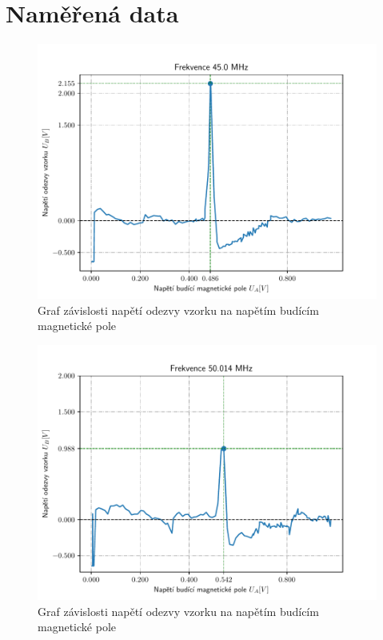 \documentclass{article}
\begin{document}
\section{Naměřená data}
\begin{figure}[!h]
  \hspace*{-10em}
  \includegraphics[scale=1.2]{figs/1.pdf}
  \caption{Graf závislosti napětí odezvy vzorku na napětím budícím magnetické pole}
\end{figure}
\begin{figure}[!h]
  \hspace*{-10em}
  \includegraphics[scale=1.2]{figs/2.pdf}
  \caption{Graf závislosti napětí odezvy vzorku na napětím budícím magnetické pole}
\end{figure}
\end{document}

